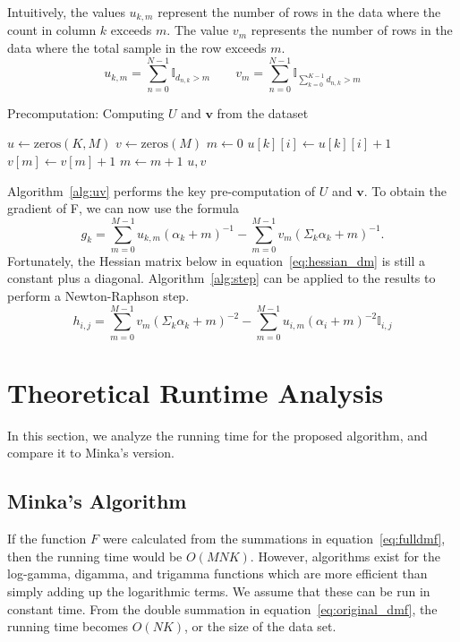 \documentclass[twoside]{article}
\begin{document}
Intuitively, the values $u_{k,m}$ represent the number of rows in the data where the count in column $k$ exceeds $m$.  The value $v_m$ represents the number of rows in the data where the total sample in the row exceeds $m$.  
\[
u_{k,m}=\sum_{n=0}^{N-1}\mathbb{I}_{d_{n,k} > m} \qquad v_m=\sum_{n=0}^{N-1}\mathbb{I}_{\sum_{k=0}^{K-1}d_{n,k} > m}
\]
\begin{algorithm}
  \caption{Precomputation: Computing $U$ and $\mathbf{v}$ from the dataset}
  \begin{algorithmic}
    \State $u \gets \text{zeros}(K, M)$
    \State $v \gets \text{zeros}(M)$
      \State $m \leftarrow 0$
          \State $u[k][i] \leftarrow u[k][i] + 1$
          \State $v[m] \leftarrow v[m] + 1$        
          \State $m \leftarrow m + 1$
        \EndFor
      \EndFor
    \EndFor
    \State \Return $u, v$
  \EndFunction
  \end{algorithmic}
  \label{alg:uv}
\end{algorithm}

Algorithm~\ref{alg:uv} performs the key pre-computation of $U$ and $\mathbf{v}$. To obtain the gradient of F, we can now use the formula
\[
g_k= \sum_{m=0}^{M-1}u_{k,m}(\alpha_k+m)^{-1}-
\sum_{m=0}^{M-1}v_m(\Sigma_k\alpha_k+m)^{-1}.
\]
Fortunately, the Hessian matrix below in equation~\eqref{eq:hessian_dm} is still a constant plus a diagonal.  Algorithm~\ref{alg:step} can be applied to the results to perform a Newton-Raphson step.
\begin{equation} \label{eq:hessian_dm}
h_{i,j}=\sum_{m=0}^{M-1}v_m(\Sigma_k\alpha_k+m)^{-2}-
\sum_{m=0}^{M-1}u_{i,m}(\alpha_i+m)^{-2}\mathbb{I}_{i,j}
\end{equation}
\section{Theoretical Runtime Analysis}
In this section, we analyze the running time for the proposed algorithm, and compare it to Minka's version.
\subsection{Minka's Algorithm}
If the function $F$ were calculated from the summations in equation~\eqref{eq:fulldmf}, then the running time would be $O(MNK)$.  However, algorithms exist for the log-gamma, digamma, and trigamma functions which are more efficient than simply adding up the logarithmic terms\cite{wallach}. We assume that these can be run in constant time.  From the double summation in equation~\eqref{eq:original_dmf}, the running time becomes $O(NK)$, or the size of the data set.
\end{document}
